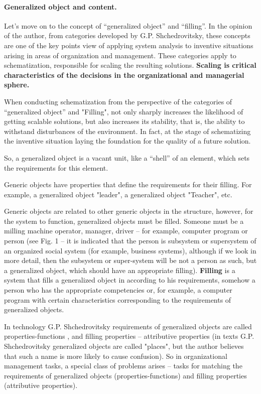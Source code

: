 \paragraph{Generalized object and content.}
Let's move on to the concept of “generalized object” and “filling”. In the
opinion of the author, from categories developed by G.P. Shchedrovitsky, these
concepts are one of the key points view of applying system analysis to
inventive situations arising in areas of organization and management. These
categories apply to schematization, responsible for scaling the resulting
solutions. \textbf{Scaling is critical characteristics of the decisions in the
  organizational and managerial sphere.}

When conducting schematization from the perspective of the categories of
“generalized object” and "Filling", not only sharply increases the likelihood
of getting scalable solutions, but also increases its stability, that is, the
ability to withstand disturbances of the environment. In fact, at the stage of
schematizing the inventive situation laying the foundation for the quality of
a future solution.

So, a generalized object is a vacant unit, like a “shell” of an element, which
sets the requirements for this element.

Generic objects have properties that define the requirements for their
filling.  For example, a generalized object "leader", a generalized object
"Teacher", etc.

Generic objects are related to other generic objects in the structure,
however, for the system to function, generalized objects must be filled.
Someone must be a milling machine operator, manager, driver -- for example,
computer program or person (see Fig. 1 -- it is indicated that the person is
subsystem or supersystem of an organized social system (for example, business
systems), although if we look in more detail, then the subsystem or
super-system will be not a person as such, but a generalized object, which
should have an appropriate filling). \textbf{Filling} is a system that fills a
generalized object in according to his requirements, somehow a person who has
the appropriate competencies or, for example, a computer program with certain
characteristics corresponding to the requirements of generalized objects.

In technology G.P. Shchedrovitsky requirements of generalized objects are
called properties-functions , and filling properties -- attributive properties
(in texts G.P. Shchedrovitsky generalized objects are called "places", but the
author believes that such a name is more likely to cause confusion). So in
organizational management tasks, a special class of problems arises -- tasks
for matching the requirements of generalized objects (properties-functions)
and filling properties (attributive properties).

